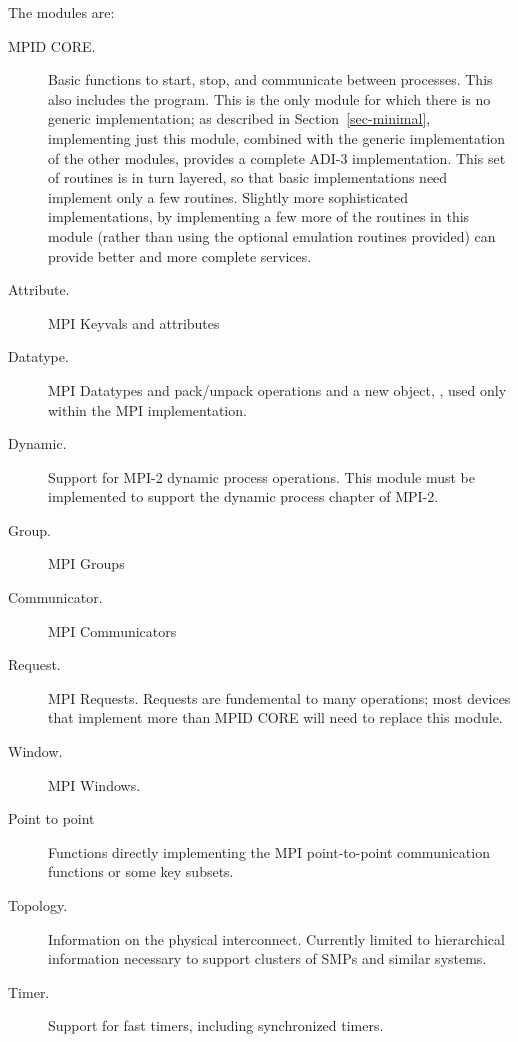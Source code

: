 \documentclass{article}
\begin{document}
The modules are:
\begin{description}
\item[MPID CORE.] Basic functions to start, stop, and communicate
between processes.  This also includes the  program.
This is the only module for which there is no generic implementation; as
described in Section~\ref{sec-minimal}, implementing just this module,
combined with the generic implementation of the other modules, provides a
complete ADI-3 implementation.  This set of routines is in turn
layered, so that basic implementations need implement only a few
routines.  Slightly more sophisticated implementations, by
implementing a few more of the routines in this module (rather than
using the optional emulation routines provided) can provide better and
more complete services.

\item[Attribute.] MPI Keyvals and attributes

\item[Datatype.] MPI Datatypes and pack/unpack operations and a new
object, , used only within the MPI implementation.

\item[Dynamic.] Support for MPI-2 dynamic process operations.  This
module must be implemented to support the dynamic process chapter of MPI-2.

\item[Group.] MPI Groups

\item[Communicator.] MPI Communicators

\item[Request.] MPI Requests.  Requests are fundemental to many
operations; most devices that implement more than MPID CORE will need
to replace this module.

\item[Window.] MPI Windows.

\item[Point to point]Functions directly implementing the MPI
point-to-point communication functions or some key subsets.

\item[Topology.]Information on the physical interconnect.  Currently
limited to hierarchical information necessary to support clusters of
SMPs and similar systems.

\item[Timer.] Support for fast timers, including synchronized timers.


\end{description}
\end{document}
